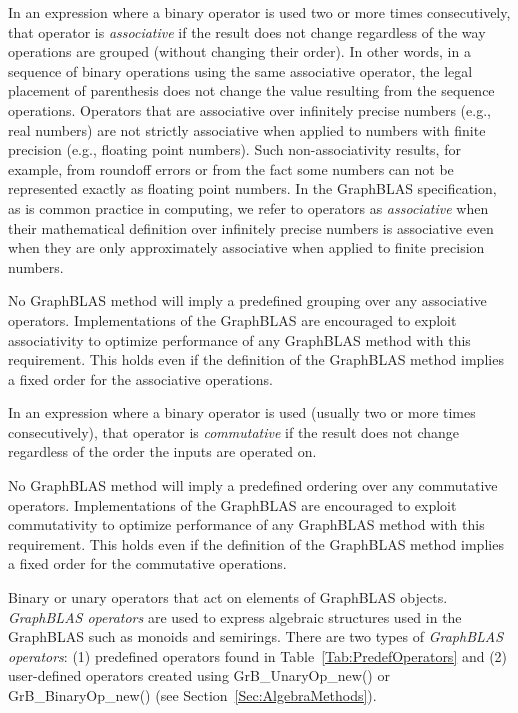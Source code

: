 \glossBegin
{} In an expression where a binary operator is used 
two or more times consecutively, that operator is \emph{associative} if the result 
does not change regardless of the way operations are grouped (without changing their order). 
In other words, in a sequence of binary operations using the same associative 
operator, the legal placement of parenthesis does not change the value resulting 
from the sequence operations.  Operators that are associative over infinitely 
precise numbers (e.g., real numbers) are not strictly associative when applied to 
numbers with finite precision (e.g., floating point numbers). Such non-associativity 
results, for example, from roundoff errors or from the fact some numbers can not 
be represented exactly as floating point numbers.   In the GraphBLAS specification, 
as is common practice in computing, we refer to operators as \emph{associative} 
when their mathematical definition over infinitely precise numbers is associative 
even when they are only approximately associative when applied to finite precision 
numbers.

No GraphBLAS method will imply a predefined grouping over any associative operators. 
Implementations of the GraphBLAS are encouraged to exploit associativity to optimize 
performance of any GraphBLAS method with this requirement. This holds even if the 
definition of the GraphBLAS method implies a fixed order for the associative operations.

 In an expression where a binary operator is used (usually
two or more times consecutively), that operator is \emph{commutative} if the result does 
not change regardless of the order the inputs are operated on.

No GraphBLAS method will imply a predefined ordering over any commutative operators. 
Implementations of the GraphBLAS are encouraged to exploit commutativity to optimize 
performance of any GraphBLAS method with this requirement. This holds even if the 
definition of the GraphBLAS method implies a fixed order for the commutative operations.

 Binary or unary operators that act on elements of GraphBLAS 
objects.  \emph{GraphBLAS operators} are used to express algebraic structures used in the 
GraphBLAS such as monoids and semirings. There are two types of \emph{GraphBLAS operators}: 
(1) predefined operators found in Table~\ref{Tab:PredefOperators} and (2) user-defined 
operators created using {\sf GrB\_UnaryOp\_new()} or {\sf GrB\_BinaryOp\_new()} 
(see Section~\ref{Sec:AlgebraMethods}).

